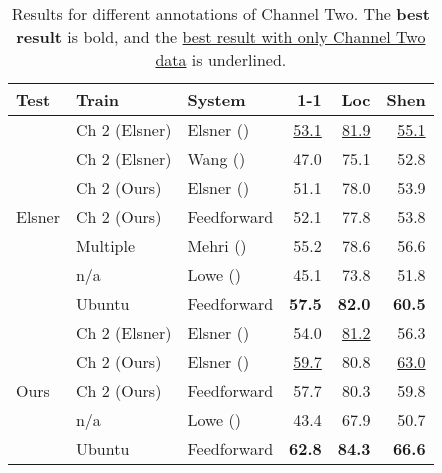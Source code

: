\documentclass[11pt,a4paper]{article}
\begin{document}
\begin{table}
    \centering
    \small
    \setlength{\tabcolsep}{4pt}
    \begin{tabular}{lllrrr}
        \toprule
        Test & Train & System & 1-1 & Loc & Shen \\
        \midrule
        \multirow{7}{*}{Elsner}
          & Ch 2 (Elsner)       & Elsner (\citeyear{elsner:2008})      & \underline{53.1} & \underline{81.9} & \underline{55.1} \\ 
          & Ch 2 (Elsner)       & Wang (\citeyear{Wang:2009})          &            47.0  &            75.1  &            52.8  \\
          & Ch 2 (Ours)         & Elsner (\citeyear{elsner:2008})      &            51.1  &            78.0  &            53.9  \\ 
          & Ch 2 (Ours)         & Feedforward                          &            52.1  &            77.8  &            53.8  \\
        \cmidrule(l){2-6}
          & Multiple            & Mehri (\citeyear{Mehri:2017:IJCNLP}) &            55.2  &            78.6  &            56.6  \\
          & n/a                 & Lowe (\citeyear{Lowe:2017:DD})       &            45.1  &            73.8  &            51.8  \\
          & Ubuntu              & Feedforward                          &    \textbf{57.5} &    \textbf{82.0} &    \textbf{60.5} \\
        \midrule
        \multirow{5}{*}{Ours}
          & Ch 2 (Elsner)       & Elsner (\citeyear{elsner:2008})      &            54.0  & \underline{81.2} &            56.3  \\ 
          & Ch 2 (Ours)         & Elsner (\citeyear{elsner:2008})      & \underline{59.7} &            80.8  & \underline{63.0} \\
          & Ch 2 (Ours)         & Feedforward                          &            57.7  &            80.3  &            59.8  \\
        \cmidrule(l){2-6}
          & n/a                 & Lowe (\citeyear{Lowe:2017:DD})       &            43.4  &            67.9  &            50.7  \\
          & Ubuntu              & Feedforward                          &    \textbf{62.8} &    \textbf{84.3} &    \textbf{66.6} \\
        \bottomrule
    \end{tabular}
    \caption{\label{tab:res:elsner}
    Results for different annotations of Channel Two.
    The \textbf{best result} is bold, and the \underline{best result with only Channel Two data} is underlined.
    }
\end{table}
\end{document}
